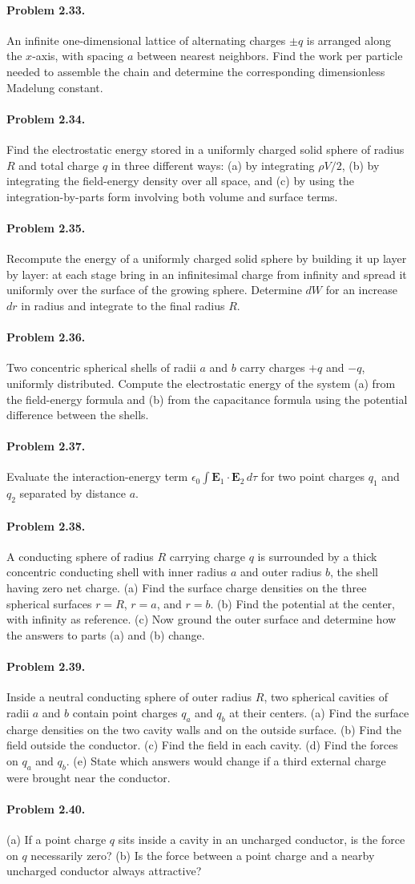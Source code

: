 \documentclass{aa}
\newcommand{\problemstatement}[2]{%
\paragraph{Problem #1.}#2\par\medskip
}
\begin{document}
\problemstatement{2.33}{An infinite one-dimensional lattice of alternating charges \(\pm q\) is arranged along the \(x\)-axis, with spacing \(a\) between nearest neighbors. Find the work per particle needed to assemble the chain and determine the corresponding dimensionless Madelung constant.}
\problemstatement{2.34}{Find the electrostatic energy stored in a uniformly charged solid sphere of radius \(R\) and total charge \(q\) in three different ways: (a) by integrating \(\rho V/2\), (b) by integrating the field-energy density over all space, and (c) by using the integration-by-parts form involving both volume and surface terms.}
\problemstatement{2.35}{Recompute the energy of a uniformly charged solid sphere by building it up layer by layer: at each stage bring in an infinitesimal charge from infinity and spread it uniformly over the surface of the growing sphere. Determine \(dW\) for an increase \(dr\) in radius and integrate to the final radius \(R\).}
\problemstatement{2.36}{Two concentric spherical shells of radii \(a\) and \(b\) carry charges \(+q\) and \(-q\), uniformly distributed. Compute the electrostatic energy of the system (a) from the field-energy formula and (b) from the capacitance formula using the potential difference between the shells.}
\problemstatement{2.37}{Evaluate the interaction-energy term \(\epsilon_0\int \mathbf E_1\cdot\mathbf E_2\,d\tau\) for two point charges \(q_1\) and \(q_2\) separated by distance \(a\).}
\problemstatement{2.38}{A conducting sphere of radius \(R\) carrying charge \(q\) is surrounded by a thick concentric conducting shell with inner radius \(a\) and outer radius \(b\), the shell having zero net charge. (a) Find the surface charge densities on the three spherical surfaces \(r=R\), \(r=a\), and \(r=b\). (b) Find the potential at the center, with infinity as reference. (c) Now ground the outer surface and determine how the answers to parts (a) and (b) change.}
\problemstatement{2.39}{Inside a neutral conducting sphere of outer radius \(R\), two spherical cavities of radii \(a\) and \(b\) contain point charges \(q_a\) and \(q_b\) at their centers. (a) Find the surface charge densities on the two cavity walls and on the outside surface. (b) Find the field outside the conductor. (c) Find the field in each cavity. (d) Find the forces on \(q_a\) and \(q_b\). (e) State which answers would change if a third external charge were brought near the conductor.}
\problemstatement{2.40}{(a) If a point charge \(q\) sits inside a cavity in an uncharged conductor, is the force on \(q\) necessarily zero? (b) Is the force between a point charge and a nearby uncharged conductor always attractive?}
\end{document}
